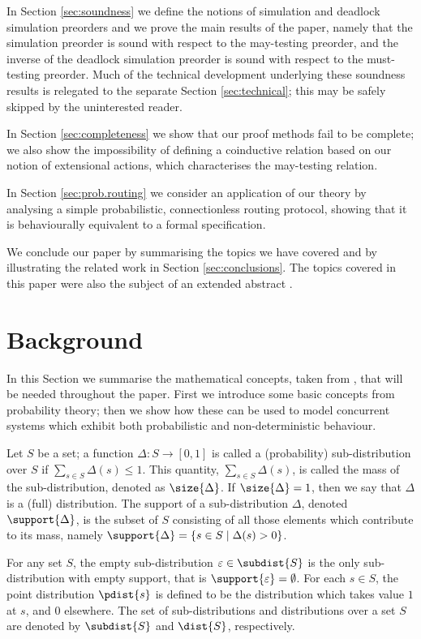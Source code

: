 \documentclass{LMCS}
\begin{document}
In Section \ref{sec:soundness} we define the notions of simulation and 
deadlock simulation preorders and we prove the main results of the paper, 
namely that the simulation preorder is sound with respect to the may-testing 
preorder, and the inverse of the deadlock simulation preorder is sound 
with respect to the must-testing preorder. Much of the technical 
development underlying these soundness results is relegated to the separate 
Section \ref{sec:technical}; this may be safely skipped by the uninterested reader.

In Section \ref{sec:completeness} we show that our proof methods fail to be 
complete; we also show the impossibility of defining 
a coinductive relation based on our notion of extensional actions, which characterises 
the may-testing relation. 

In Section \ref{sec:prob.routing} we consider an application of our theory 
by analysing a simple probabilistic, connectionless routing protocol, 
showing that it is behaviourally equivalent to a formal specification. 

We conclude our paper by summarising the topics we have covered and by illustrating 
the related work in Section \ref{sec:conclusions}. The topics 
covered in this paper were also the subject of an extended abstract 
\cite{extabs}.

\section{Background}
\label{sec:background}

In this Section we summarise the mathematical concepts, taken
from \cite{DGHM09full}, that will be needed throughout the paper.
First we introduce some basic concepts from  probability theory;
then we show how these can be used to model concurrent systems
which  exhibit  both probabilistic and non-deterministic
behaviour. 

Let $S$ be a set; a function $\Delta: S \rightarrow [0,1]$ is called a
(probability) sub-distribution over $S$ if $\sum_{s \in S} \Delta(s)
\leq 1$.  This quantity, $\sum_{s \in S} \Delta(s)$, is called the mass of the
sub-distribution, denoted as $\size{\Delta}$. If $\size{\Delta} = 1$,
then we say that $\Delta$ is a (full) distribution. The support of a
sub-distribution $\Delta$, denoted $\support{\Delta}$, is the subset of
$S$ consisting of all those elements which contribute to its mass,
namely $\support{\Delta} = \{s \in S\;|\; \Delta(s) > 0\}$. 

For any set $S$, the empty sub-distribution $\varepsilon \in 
\subdist{S}$ is the only sub-distribution with empty support, 
that is $\support{\varepsilon} = \emptyset$.
For each
$s \in S$, the point distribution $\pdist{s}$ is defined to be the
distribution which takes value $1$ at $s$, and $0$ elsewhere.  The set
of sub-distributions and distributions over a set $S$ are denoted by
$\subdist{S}$ and $\dist{S}$, respectively.
\end{document}
